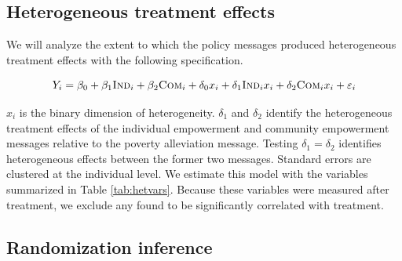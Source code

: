 \documentclass[11pt, a4paper]{article}\usepackage[]{graphicx}\usepackage[]{color}
\begin{document}
    \subsection{Heterogeneous treatment effects}

        We will analyze the extent to which the policy messages produced heterogeneous treatment effects with the following specification.

        \begin{equation}
            Y_{i} = \beta_{0} + \beta_{1}\text{\textsc{Ind}}_{i} + \beta_{2}\text{\textsc{Com}}_{i} + \delta_{0} x_i + \delta_{1}\text{\textsc{Ind}}_{i} x_i + \delta_{2}\text{\textsc{Com}}_{i} x_i + \varepsilon_{i}
        \label{eq:heteffect} \end{equation}

        $x_{i}$ is the binary dimension of heterogeneity. $\delta_{1}$ and $\delta_{2}$ identify the heterogeneous treatment effects of the individual empowerment and community empowerment messages relative to the poverty alleviation message. Testing $\delta_{1} = \delta_{2}$ identifies heterogeneous effects between the former two messages. Standard errors are clustered at the individual level. We estimate this model with the  variables summarized in Table \ref{tab:hetvars}. Because these variables were measured after treatment, we exclude any found to be significantly correlated with treatment.

        \begin{table}[h]
        \centering
        \caption{Dimensions of heterogeneity}
        \label{tab:hetvars}
        \end{table}

    \subsection{Randomization inference}
\end{document}
